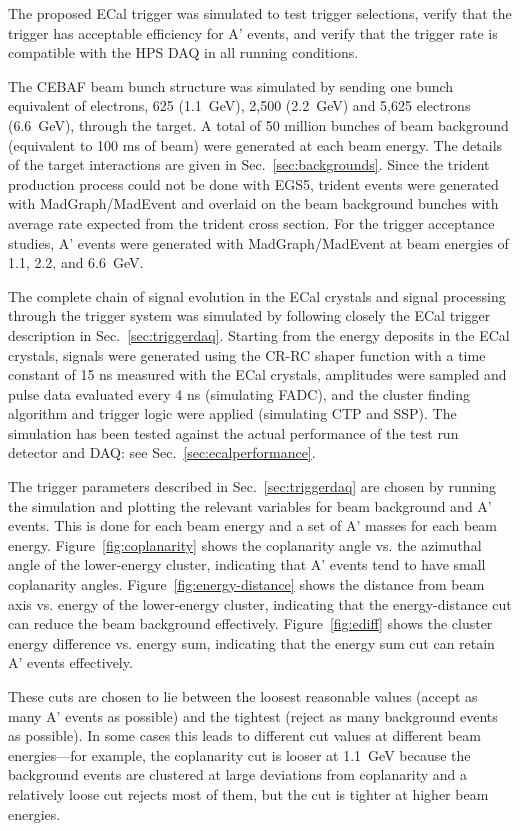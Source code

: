 The proposed ECal trigger was simulated to test trigger selections, verify
that the trigger has acceptable efficiency for A' events, and verify 
that the trigger rate is compatible with the HPS DAQ in all running conditions. 

The CEBAF beam bunch structure was simulated by sending one bunch 
equivalent of electrons, 
625 (1.1~GeV), 2,500 (2.2~GeV) and 5,625 electrons (6.6~GeV), through 
the target. A total of 50 million bunches of beam background 
(equivalent to 100 ms of beam) were 
generated at each beam energy. The details of the target interactions are given in Sec.~\ref{sec:backgrounds}.
Since the trident production process 
could not be done with EGS5, trident events were generated with MadGraph/MadEvent 
and overlaid on the beam background bunches with average rate 
expected from the trident cross section.
For the trigger acceptance studies, A' events were generated with 
MadGraph/MadEvent at beam energies of 1.1, 2.2, and 6.6~GeV.

The complete chain of signal evolution in the ECal crystals and 
signal processing through the trigger system was simulated
by following closely the ECal trigger description in Sec.~\ref{sec:triggerdaq}. 
Starting from the energy deposits in the ECal crystals, signals were 
generated using the CR-RC shaper function with a time constant of 15 ns
measured with the ECal crystals, amplitudes were sampled and pulse data 
evaluated every 4 ns (simulating FADC), and the cluster 
finding algorithm and trigger logic were applied (simulating CTP and SSP). 
The simulation has been tested against the actual performance of the test run detector and DAQ: see Sec.~\ref{sec:ecalperformance}.

The trigger parameters described in Sec.~\ref{sec:triggerdaq} are 
chosen by running the simulation and plotting the relevant variables 
for beam background and A' events. This is done for each beam energy 
and a set of A' masses for each beam energy. 
Figure~\ref{fig:coplanarity} shows the coplanarity angle vs. the azimuthal 
angle of the lower-energy cluster, indicating that A' events 
tend to have small coplanarity angles. Figure~\ref{fig:energy-distance} shows
the distance from beam axis vs. energy of the lower-energy cluster,
indicating that the energy-distance cut can reduce the beam background effectively.
Figure~\ref{fig:ediff} shows the cluster energy difference vs. energy sum,
indicating that the energy sum cut can retain A' events effectively.       


These cuts are chosen to lie between the loosest reasonable values (accept as many A' events as possible) and the tightest (reject as many background events as possible). In some cases this leads to different cut values at different beam energies---for example, the coplanarity cut is looser at 1.1~GeV because the background events are clustered at large deviations from coplanarity and a relatively loose cut rejects most of them, but the cut is tighter at higher beam energies.

